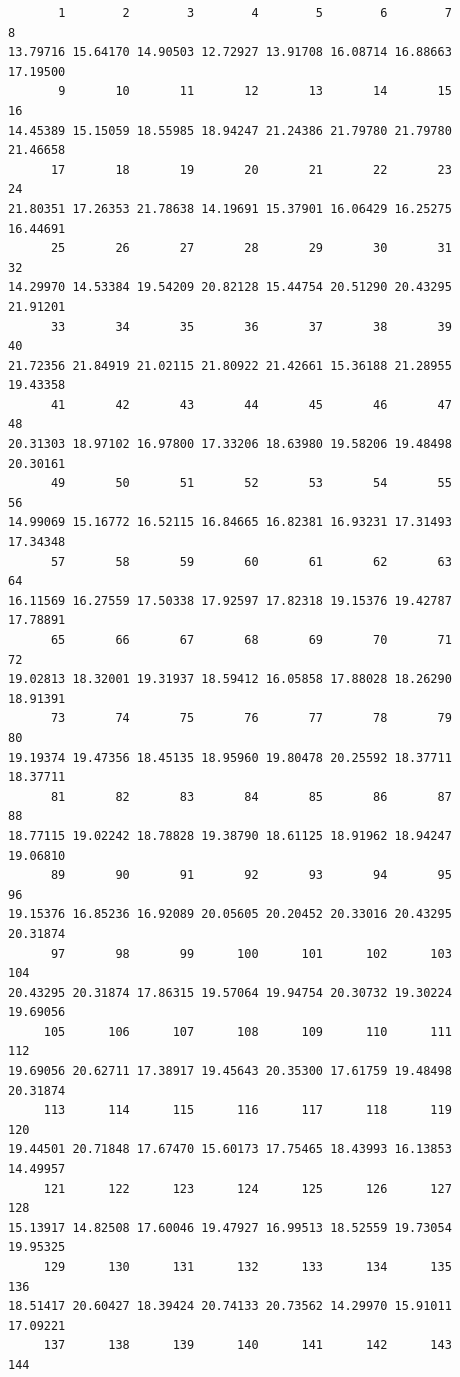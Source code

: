 \documentclass[
  letterpaper,
  DIV=11,
  numbers=noendperiod]{scrreprt}
\begin{document}
\begin{verbatim}
       1        2        3        4        5        6        7        8 
13.79716 15.64170 14.90503 12.72927 13.91708 16.08714 16.88663 17.19500 
       9       10       11       12       13       14       15       16 
14.45389 15.15059 18.55985 18.94247 21.24386 21.79780 21.79780 21.46658 
      17       18       19       20       21       22       23       24 
21.80351 17.26353 21.78638 14.19691 15.37901 16.06429 16.25275 16.44691 
      25       26       27       28       29       30       31       32 
14.29970 14.53384 19.54209 20.82128 15.44754 20.51290 20.43295 21.91201 
      33       34       35       36       37       38       39       40 
21.72356 21.84919 21.02115 21.80922 21.42661 15.36188 21.28955 19.43358 
      41       42       43       44       45       46       47       48 
20.31303 18.97102 16.97800 17.33206 18.63980 19.58206 19.48498 20.30161 
      49       50       51       52       53       54       55       56 
14.99069 15.16772 16.52115 16.84665 16.82381 16.93231 17.31493 17.34348 
      57       58       59       60       61       62       63       64 
16.11569 16.27559 17.50338 17.92597 17.82318 19.15376 19.42787 17.78891 
      65       66       67       68       69       70       71       72 
19.02813 18.32001 19.31937 18.59412 16.05858 17.88028 18.26290 18.91391 
      73       74       75       76       77       78       79       80 
19.19374 19.47356 18.45135 18.95960 19.80478 20.25592 18.37711 18.37711 
      81       82       83       84       85       86       87       88 
18.77115 19.02242 18.78828 19.38790 18.61125 18.91962 18.94247 19.06810 
      89       90       91       92       93       94       95       96 
19.15376 16.85236 16.92089 20.05605 20.20452 20.33016 20.43295 20.31874 
      97       98       99      100      101      102      103      104 
20.43295 20.31874 17.86315 19.57064 19.94754 20.30732 19.30224 19.69056 
     105      106      107      108      109      110      111      112 
19.69056 20.62711 17.38917 19.45643 20.35300 17.61759 19.48498 20.31874 
     113      114      115      116      117      118      119      120 
19.44501 20.71848 17.67470 15.60173 17.75465 18.43993 16.13853 14.49957 
     121      122      123      124      125      126      127      128 
15.13917 14.82508 17.60046 19.47927 16.99513 18.52559 19.73054 19.95325 
     129      130      131      132      133      134      135      136 
18.51417 20.60427 18.39424 20.74133 20.73562 14.29970 15.91011 17.09221 
     137      138      139      140      141      142      143      144 

\end{verbatim}
\end{document}
